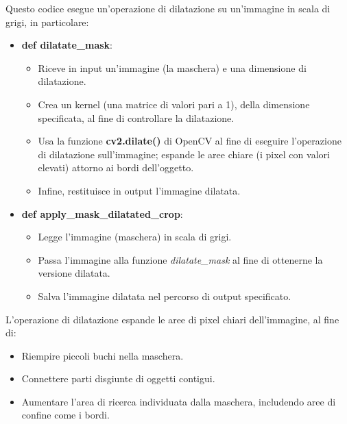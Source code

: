 \documentclass[12pt,a4paper,openright,twoside]{book}
\begin{document}
Questo codice esegue un'operazione di dilatazione su un'immagine in scala di grigi, in particolare:
\begin{itemize}
\item \textbf{def dilatate\_mask}:\\
\begin{itemize}
\item Riceve in input un'immagine (la maschera) e una dimensione di dilatazione.
\item Crea un kernel (una matrice di valori pari a 1), della dimensione specificata, al fine di controllare la dilatazione.
\item Usa la funzione \textbf{cv2.dilate()} di OpenCV al fine di eseguire l'operazione di dilatazione sull'immagine; espande le aree chiare (i pixel con valori elevati) attorno ai bordi dell'oggetto.
\item Infine, restituisce in output l'immagine dilatata.
\end{itemize}
\item \textbf{def apply\_mask\_dilatated\_crop}:
\begin{itemize}
\item Legge l'immagine (maschera) in scala di grigi.
\item Passa l'immagine alla funzione {\itshape dilatate\_mask} al fine di ottenerne la versione dilatata.
\item Salva l'immagine dilatata nel percorso di output specificato.
\end{itemize}
\end{itemize}

L'operazione di dilatazione espande le aree di pixel chiari dell'immagine, al fine di:
\begin{itemize}
\item Riempire piccoli buchi nella maschera.
\item Connettere parti disgiunte di oggetti contigui.
\item Aumentare l'area di ricerca individuata dalla maschera, includendo aree di confine come i bordi.
\end{itemize}
\end{document}
